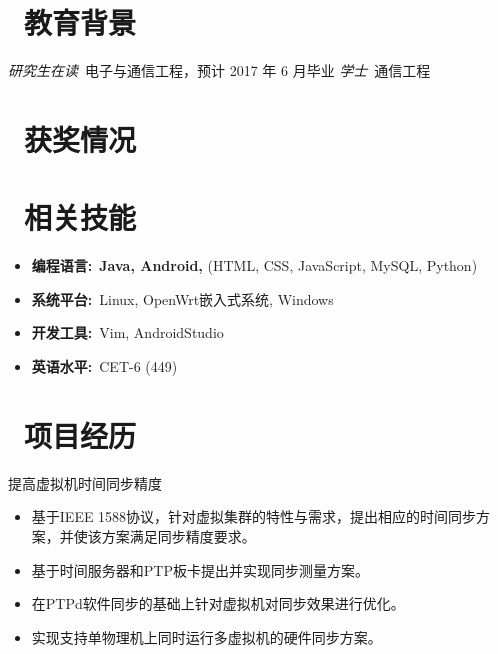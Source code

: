 \documentclass{resume}
\begin{document}


 
\section{\faGraduationCap\  教育背景}
\textit{研究生在读}\ 电子与通信工程，预计 2017 年 6 月毕业
\textit{学士}\ 通信工程

\section{\faTrophy\ 获奖情况}
\begin{onehalfspacing}
\end{onehalfspacing}

\section{\faCogs\ 相关技能}
\begin{itemize}[parsep=0.5ex]
  \item \textbf{编程语言:}\ \textbf{Java, Android,} (HTML, CSS, JavaScript, MySQL, Python) 
  \item \textbf{系统平台:}\ Linux, OpenWrt嵌入式系统, Windows
  \item \textbf{开发工具:}\ Vim, AndroidStudio
  \item \textbf{英语水平:}\ CET-6 (449)
\end{itemize}

\section{\faUsers\ 项目经历}
\setlength{\parindent}{2em}提高虚拟机时间同步精度
\begin{onehalfspacing}
\begin{itemize}[leftmargin=5em]
  \item 基于IEEE 1588协议，针对虚拟集群的特性与需求，提出相应的时间同步方案，并使该方案满足同步精度要求。
  \item 基于时间服务器和PTP板卡提出并实现同步测量方案。
  \item 在PTPd软件同步的基础上针对虚拟机对同步效果进行优化。
  \item 实现支持单物理机上同时运行多虚拟机的硬件同步方案。
\end{itemize}
\end{onehalfspacing}
\end{document}
